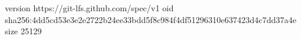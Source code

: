 version https://git-lfs.github.com/spec/v1
oid sha256:4dd5cd53e3e2e2722b24ee33bdd5f8c984f4df51296310e637423d4c7dd37a4e
size 25129
